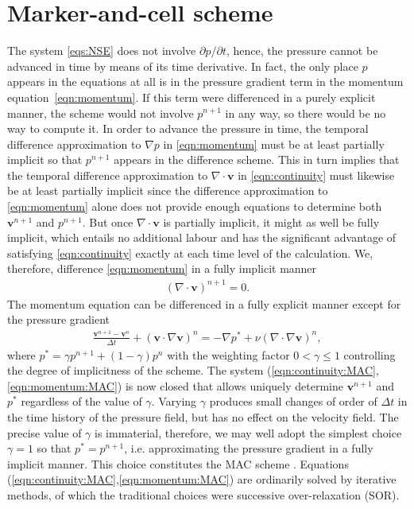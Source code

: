 \documentclass{article}
\begin{document}
\section{Marker-and-cell scheme}\label{sec:marker-and-cell-scheme}

The system \eqref{eqs:NSE} does not involve $\partial p / \partial t$, hence, the pressure cannot be advanced in time by means of its time derivative. In fact, the only place $p$ appears in the equations at all is in the pressure gradient term in the momentum equation~\eqref{eqn:momentum}. If this term were differenced in a purely explicit manner, the scheme would not involve $p^{n+1}$ in any way, so there would be no way to compute it. In order to advance the pressure in time, the temporal difference approximation to $\nabla p$ in \eqref{eqn:momentum} must be at least partially implicit so that $p^{n+1}$ appears in the difference scheme. This in turn implies that the temporal difference approximation to $\nabla \cdot \boldsymbol{v}$ in \eqref{eqn:continuity} must likewise be at least partially implicit since the difference
approximation to \eqref{eqn:momentum} alone does not provide enough equations to determine both $\boldsymbol{v}^{n+1}$ and $p^{n+1}$. But once $\nabla \cdot \boldsymbol{v}$ is partially implicit, it might as well be fully implicit, which entails no additional labour and has the significant advantage of satisfying \eqref{eqn:continuity} exactly at each time level
of the calculation. We, therefore, difference \eqref{eqn:momentum} in a fully implicit manner
\begin{align}
\label{eqn:continuity:MAC}
\left(\nabla \cdot \boldsymbol{v}\right)^{n+1} = 0.
\end{align}
The momentum equation can be differenced in a fully explicit manner except for the pressure gradient
\begin{align}
\label{eqn:momentum:MAC}
\frac{\boldsymbol{v}^{n+1}-\boldsymbol{v}^{n}}{\Delta t} + \left(\boldsymbol{v} \cdot \nabla \boldsymbol{v}\right)^{n} = - \nabla p^{*} + \nu \left(\nabla \cdot \nabla \boldsymbol{v}\right)^{n},
\end{align}
where $p^{*} = \gamma p^{n+1} + (1-\gamma) p^{n}$ with the weighting factor $0 < \gamma \le 1$ controlling the degree of implicitness of the scheme. The system (\eqref{eqn:continuity:MAC},\eqref{eqn:momentum:MAC}) is now closed that allows uniquely determine $\boldsymbol{v}^{n+1}$ and $p^{*}$ regardless of the value of $\gamma$. Varying $\gamma$ produces small changes of order of $\Delta t$ in the time history of the pressure field, but has no effect on the velocity field. The precise value of $\gamma$ is immaterial, therefore, we may well adopt the simplest choice $\gamma=1$ so that $p^{*}=p^{n+1}$, i.e. approximating the pressure gradient in a fully implicit manner. This choice constitutes the MAC scheme \cite{Harlow:1965}. Equations (\eqref{eqn:continuity:MAC},\eqref{eqn:momentum:MAC}) are ordinarily solved by iterative methods, of which the traditional choices were successive over-relaxation (SOR).
\end{document}
